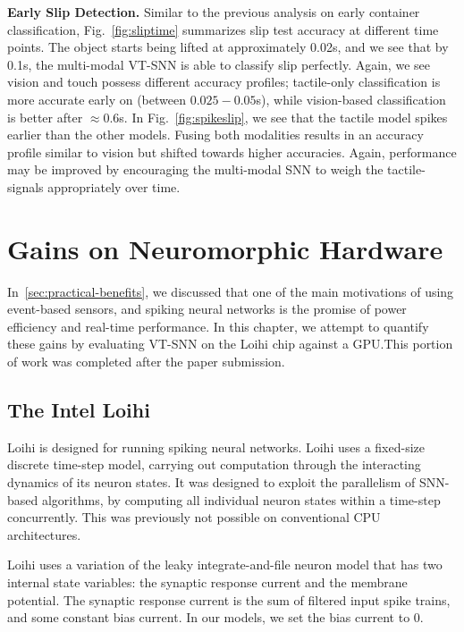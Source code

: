 \documentclass[fyp]{socreport}
\begin{document}
\vspace{0.3em}
\noindent\textbf{Early Slip Detection.} Similar to the previous analysis on
early container classification, Fig.~\ref{fig:sliptime} summarizes slip test
accuracy at different time points. The object starts being lifted at
approximately 0.02s, and we see that by 0.1s, the multi-modal VT-SNN is able to
classify slip perfectly. Again, we see vision and touch possess different
accuracy profiles; tactile-only classification is more accurate early on
(between $0.025-0.05$s), while vision-based classification is better after
$\approx 0.6$s. In Fig.~\ref{fig:spikeslip}, we see that the tactile model
spikes earlier than the other models. Fusing both modalities results in an
accuracy profile similar to vision but shifted towards higher accuracies. Again,
performance may be improved by encouraging the multi-modal SNN to weigh the
tactile-signals appropriately over time.

\chapter{Gains on Neuromorphic Hardware\label{cha:neuromorphic}}

In~\autoref{sec:practical-benefits}, we discussed that one of the main
motivations of using event-based sensors, and spiking neural networks is the
promise of power efficiency and real-time performance. In this chapter, we
attempt to quantify these gains by evaluating VT-SNN on the Loihi chip against a
GPU.\@ This portion of work was completed after the paper submission.

\section{The Intel Loihi}

Loihi is designed for running spiking neural networks. Loihi uses a fixed-size
discrete time-step model, carrying out computation through the interacting
dynamics of its neuron states. It was designed to exploit the parallelism of
SNN-based algorithms, by computing all individual neuron states within a
time-step concurrently. This was previously not possible on conventional CPU
architectures.

Loihi uses a variation of the leaky integrate-and-file neuron model that has two
internal state variables: the synaptic response current and the membrane
potential. The synaptic response current is the sum of filtered input spike
trains, and some constant bias current. In our models, we set the bias current
to 0.
\end{document}
